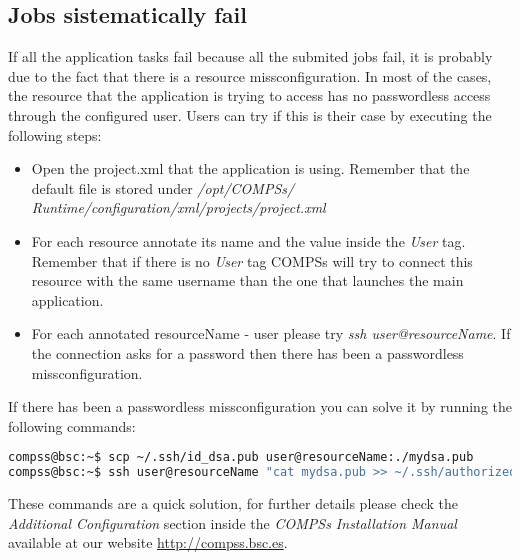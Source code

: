 \subsection{Jobs sistematically fail}
If all the application tasks fail because all the submited jobs fail, it is probably due to the fact that there is a resource 
missconfiguration. In most of the cases, the resource that the application is trying to access has no passwordless access through
the configured user. Users can try if this is their case by executing the following steps:
\begin{itemize}
 \item Open the project.xml that the application is using. Remember that the default file is stored under \textit{/opt/COMPSs/
 Runtime/configuration/xml/projects/project.xml}
 \item For each resource annotate its name and the value inside the \textit{User} tag. Remember that if there is no \textit{User}
 tag COMPSs will try to connect this resource with the same username than the one that launches the main application.
 \item For each annotated resourceName - user please try \textit{ssh user@resourceName}. If the connection asks for a password then
 there has been a passwordless missconfiguration.
\end{itemize}

If there has been a passwordless missconfiguration you can solve it by running the following commands:
\begin{lstlisting}[language=bash]
compss@bsc:~$ scp ~/.ssh/id_dsa.pub user@resourceName:./mydsa.pub
compss@bsc:~$ ssh user@resourceName "cat mydsa.pub >> ~/.ssh/authorized_keys; rm ./mydsa.pub"
\end{lstlisting}

These commands are a quick solution, for further details please check the \textit{Additional Configuration} section 
inside the \textit{COMPSs Installation Manual} available at our website \url{http://compss.bsc.es}.

